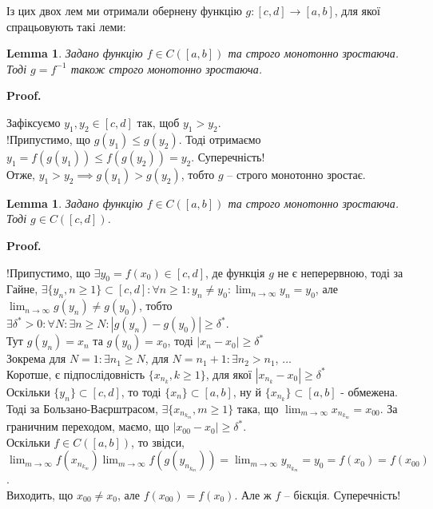 \documentclass[a4paper, 14pt]{article}
\makeatletter
\def\qed{$\blacksquare$}
\theoremstyle{theoremdd}
\theoremstyle{theoremdd}
\theoremstyle{theoremdd}
\theoremstyle{theoremdd}
\theoremstyle{theoremdd}
\theoremstyle{theoremdd}
\theoremstyle{theoremdd}
\newtheorem{lemma}[theorem]{Lemma}
\theoremstyle{theoremdd}
\renewenvironment{proof}[1][Proof.\\]{\par
\pushQED{\hfill \qed}%
\normalfont \topsep6\p@\@plus6\p@\relax
\trivlist
\item\relax
{\bfseries
#1\@addpunct{.}}\hspace\labelsep\ignorespaces
}{%
\popQED\endtrivlist\@endpefalse
}
\makeatother
\begin{document}
Із цих двох лем ми отримали обернену функцію $g: [c,d] \to [a,b]$, для якої спрацьовують такі леми:

\begin{lemma}
Задано функцію $f \in C([a,b])$ та строго монотонно зростаюча. Тоді $g = f^{-1}$ також строго монотонно зростаюча.
\end{lemma}

\begin{proof}
Зафіксуємо $y_1,y_2 \in [c,d]$ так, щоб $y_1 > y_2$.\\
!Припустимо, що $g(y_1) \leq g(y_2)$. Тоді отримаємо $y_1 = f(g(y_1)) \leq f(g(y_2)) = y_2$. Суперечність!\\
Отже, $y_1 > y_2 \implies g(y_1) > g(y_2)$, тобто $g$ -- строго монотонно зростає.
\end{proof}

\begin{lemma}
Задано функцію $f \in C([a,b])$ та строго монотонно зростаюча. Тоді $g \in C([c,d])$.
\end{lemma}

\begin{proof}
!Припустимо, що $\exists y_0 = f(x_0) \in [c,d]$, де функція $g$ не є неперервною, тоді за Гайне, $\exists \{y_n, n \geq 1\} \subset [c,d]: \forall n \geq 1: y_n \neq y_0: \displaystyle\lim_{n \to \infty} y_n = y_0$, але $\displaystyle\lim_{n \to \infty} g(y_n) \neq g(y_0)$, тобто\\
$\exists \delta^* > 0: \forall N: \exists n \geq N: |g(y_n)-g(y_0)| \geq \delta^*$.\\
Тут $g(y_n) = x_n$ та $g(y_0) = x_0$, тоді $|x_n-x_0| \geq \delta^*$\\
Зокрема для $N = 1: \exists n_1 \geq N$, для $N = n_1+1: \exists n_2 > n_1$, $\dots$\\
Коротше, є підпослідовність $\{x_{n_k}, k \geq 1\}$, для якої $|x_{n_k} -x_0| \geq \delta^*$\\
Оскільки $\{y_n\} \subset [c,d]$, то тоді $\{x_n \} \subset [a,b]$, ну й $\{x_{n_k}\} \subset [a,b]$ - обмежена. Тоді за Бользано-Ваєрштрасом, $\exists \{x_{n_{k_m}}, m \geq 1\}$ така, що $\displaystyle\lim_{m \to \infty} x_{n_{k_m}} = x_{00}$. За граничним переходом, маємо, що $|x_{00}-x_0| \geq \delta^*$.\\
Оскільки $f \in C([a,b])$, то звідси, $\displaystyle\lim_{m \to \infty} f(x_{n_{k_m}}) \lim_{m \to \infty} f(g(y_{n_{k_m}})) = \lim_{m \to \infty} y_{n_{k_m}} = y_0 = f(x_0) = f(x_{00})$.\\
Виходить, що $x_{00} \neq x_0$, але $f(x_{00}) = f(x_0)$. Але ж $f$ -- бієкція. Суперечність!
\end{proof}
\end{document}
